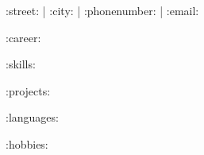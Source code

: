 \documentclass[12pt]{article}
\begin{document}

    \begin{center}
    {
        \small\bodyfont
        \faEnvelopeO\/ :street: | \faMapMarker\/ :city: | \faPhone\/ :phonenumber: |\faAt\protect\/ :email:
    }
    \end{center}


    \setlength{\parskip}{\baselineskip}
    \setlength{\parindent}{2pt}

:career:

:skills:

:projects:

:languages:

:hobbies:
\end{document}
